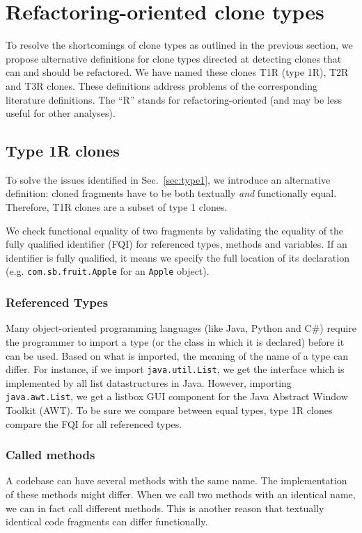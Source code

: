 \section{Refactoring-oriented clone types}
To resolve the shortcomings of clone types as outlined in the previous section, we propose alternative definitions for clone types directed at detecting clones that can and should be refactored. We have named these clones T1R (type 1R), T2R and T3R clones. These definitions address problems of the corresponding literature definitions. The ``R'' stands for refactoring-oriented (and may be less useful for other analyses).

\subsection{Type 1R clones} \label{sec:type1r}
To solve the issues identified in Sec.~\ref{sec:type1}, we introduce an alternative definition: cloned fragments have to be both textually \textit{and} functionally equal. Therefore, T1R clones are a subset of type 1 clones.

We check functional equality of two fragments by validating the equality of the fully qualified identifier (FQI) for referenced types, methods and variables. If an identifier is fully qualified, it means we specify the full location of its declaration (e.g. \texttt{com.sb.fruit.Apple} for an \texttt{Apple} object).

\subsubsection{Referenced Types}
Many object-oriented programming languages (like Java, Python and C\#) require the programmer to import a type (or the class in which it is declared) before it can be used. Based on what is imported, the meaning of the name of a type can differ. For instance, if we import \texttt{java.util.List}, we get the interface which is implemented by all list datastructures in Java. However, importing \texttt{java.awt.List}, we get a listbox GUI component for the Java Abstract Window Toolkit (AWT). To be sure we compare between equal types, type 1R clones compare the FQI for all referenced types.

\subsubsection{Called methods}
A codebase can have several methods with the same name. The implementation of these methods might differ. When we call two methods with an identical name, we can in fact call different methods. This is another reason that textually identical code fragments can differ functionally.

